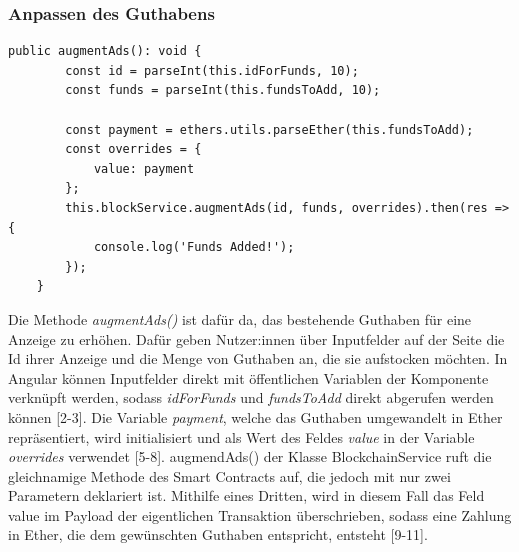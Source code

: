 \subsubsection{Anpassen des Guthabens}
\begin{lstlisting}[caption={Anpassen des Guthabens im Frontend},captionpos=b]
	public augmentAds(): void {
		const id = parseInt(this.idForFunds, 10);
		const funds = parseInt(this.fundsToAdd, 10);
		
		const payment = ethers.utils.parseEther(this.fundsToAdd);
		const overrides = {
			value: payment
		};
		this.blockService.augmentAds(id, funds, overrides).then(res => {
			console.log('Funds Added!');
		});
	}
\end{lstlisting}
Die Methode \emph{augmentAds()} ist dafür da, das bestehende Guthaben für eine Anzeige zu erhöhen. 
Dafür geben Nutzer:innen über Inputfelder auf der Seite die Id ihrer Anzeige und die Menge von Guthaben an, die sie aufstocken möchten. 
In Angular können Inputfelder direkt mit öffentlichen Variablen der Komponente verknüpft werden, sodass \emph{idForFunds} und \emph{fundsToAdd} direkt abgerufen werden können [2-3]. Die Variable \emph{payment}, welche das Guthaben umgewandelt in Ether repräsentiert, wird initialisiert und als Wert des Feldes \emph{value} in der Variable \emph{overrides} verwendet [5-8]. augmendAds() der Klasse BlockchainService ruft die gleichnamige Methode des Smart Contracts auf, die jedoch mit nur zwei Parametern deklariert ist. Mithilfe eines Dritten, wird in diesem Fall das Feld {value} im Payload der eigentlichen Transaktion überschrieben, sodass eine Zahlung in Ether, die dem gewünschten Guthaben entspricht, entsteht [9-11]. 
